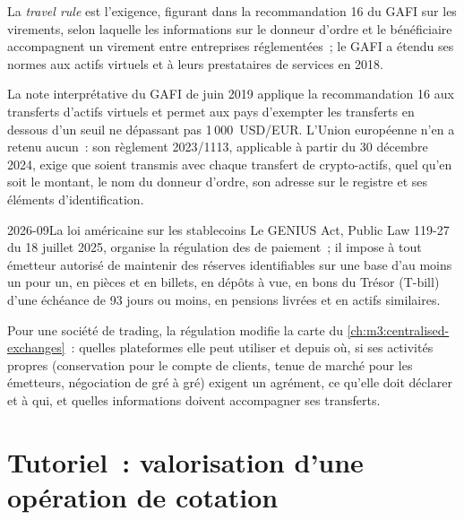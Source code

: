 \begin{definition}\label{def:m3:the-crypto-trading-business:travel}
La \emph{travel rule} est l'exigence, figurant dans la recommandation 16 du GAFI sur les virements, selon laquelle les informations sur le donneur d'ordre et le
bénéficiaire accompagnent un virement entre entreprises réglementées~; le GAFI a étendu ses normes aux actifs virtuels et à leurs prestataires de services en 2018.
\end{definition}

La note interprétative du GAFI de juin 2019 applique la recommandation 16 aux transferts d'actifs virtuels et permet aux pays d'exempter les transferts en dessous d'un seuil
ne dépassant pas 1\,000~USD/EUR. L'Union européenne n'en a retenu aucun~: son règlement 2023/1113, applicable à partir du 30 décembre 2024, exige que soient transmis
avec chaque transfert de crypto-actifs, quel qu'en soit le montant, le nom du donneur d'ordre, son adresse sur le registre et ses éléments d'identification.

\begin{dated}{2026-09}{La loi américaine sur les stablecoins}\label{dat:m3:the-crypto-trading-business:genius}
Le GENIUS Act, Public Law 119-27 du 18 juillet 2025, organise la régulation des  de paiement~; il impose à tout émetteur autorisé de maintenir des
réserves identifiables sur une base d'au moins un pour un, en pièces et en billets, en dépôts à vue, en bons du Trésor (T-bill) d'une échéance de 93 jours ou moins, en pensions livrées et
en actifs similaires.
\end{dated}

Pour une société de trading, la régulation modifie la carte du \cref{ch:m3:centralised-exchanges}~: quelles plateformes elle peut utiliser et depuis où, si ses activités propres (conservation
pour le compte de clients, tenue de marché pour les émetteurs, négociation de gré à gré) exigent un agrément, ce qu'elle doit déclarer et à qui, et quelles informations doivent
accompagner ses transferts.

\section{Tutoriel~: valorisation d'une opération de cotation}\label{tut:m3:the-crypto-trading-business:deal}

